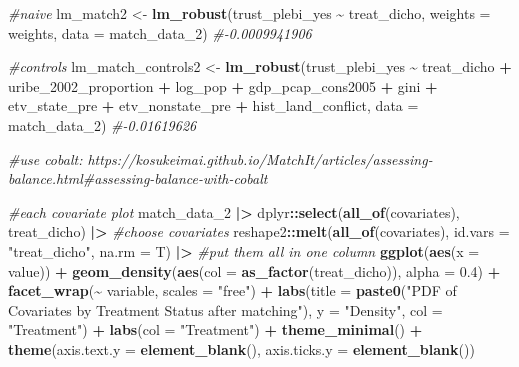 \documentclass[
]{article}
\newenvironment{Shaded}{\begin{snugshade}}{\end{snugshade}}
\newcommand{\AttributeTok}[1]{\textcolor[rgb]{0.13,0.29,0.53}{#1}}
\newcommand{\CommentTok}[1]{\textcolor[rgb]{0.56,0.35,0.01}{\textit{#1}}}
\newcommand{\FloatTok}[1]{\textcolor[rgb]{0.00,0.00,0.81}{#1}}
\newcommand{\FunctionTok}[1]{\textcolor[rgb]{0.13,0.29,0.53}{\textbf{#1}}}
\newcommand{\NormalTok}[1]{#1}
\newcommand{\OtherTok}[1]{\textcolor[rgb]{0.56,0.35,0.01}{#1}}
\newcommand{\SpecialCharTok}[1]{\textcolor[rgb]{0.81,0.36,0.00}{\textbf{#1}}}
\newcommand{\StringTok}[1]{\textcolor[rgb]{0.31,0.60,0.02}{#1}}
\begin{document}
\begin{Shaded}
\begin{Highlighting}[]
\CommentTok{\#naive}
\NormalTok{lm\_match2 }\OtherTok{\textless{}{-}} \FunctionTok{lm\_robust}\NormalTok{(trust\_plebi\_yes }\SpecialCharTok{\textasciitilde{}}\NormalTok{ treat\_dicho, }\AttributeTok{weights =}\NormalTok{ weights, }\AttributeTok{data =}\NormalTok{ match\_data\_2) }\CommentTok{\#{-}0.0009941906}

\CommentTok{\#controls}
\NormalTok{lm\_match\_controls2 }\OtherTok{\textless{}{-}} \FunctionTok{lm\_robust}\NormalTok{(trust\_plebi\_yes }\SpecialCharTok{\textasciitilde{}}\NormalTok{ treat\_dicho }\SpecialCharTok{+}\NormalTok{ uribe\_2002\_proportion }\SpecialCharTok{+}\NormalTok{ log\_pop }\SpecialCharTok{+}\NormalTok{ gdp\_pcap\_cons2005 }\SpecialCharTok{+}\NormalTok{  gini }\SpecialCharTok{+}\NormalTok{ etv\_state\_pre }\SpecialCharTok{+}\NormalTok{ etv\_nonstate\_pre }\SpecialCharTok{+}\NormalTok{ hist\_land\_conflict, }\AttributeTok{data =}\NormalTok{ match\_data\_2) }\CommentTok{\#{-}0.01619626}

\CommentTok{\#use cobalt: https://kosukeimai.github.io/MatchIt/articles/assessing{-}balance.html\#assessing{-}balance{-}with{-}cobalt}

\CommentTok{\#each covariate plot}
\NormalTok{match\_data\_2 }\SpecialCharTok{|\textgreater{}}
\NormalTok{  dplyr}\SpecialCharTok{::}\FunctionTok{select}\NormalTok{(}\FunctionTok{all\_of}\NormalTok{(covariates), treat\_dicho) }\SpecialCharTok{|\textgreater{}} \CommentTok{\#choose covariates}
\NormalTok{  reshape2}\SpecialCharTok{::}\FunctionTok{melt}\NormalTok{(}\FunctionTok{all\_of}\NormalTok{(covariates), }\AttributeTok{id.vars =} \StringTok{"treat\_dicho"}\NormalTok{, }\AttributeTok{na.rm =}\NormalTok{ T) }\SpecialCharTok{|\textgreater{}} \CommentTok{\#put them all in one column}
  \FunctionTok{ggplot}\NormalTok{(}\FunctionTok{aes}\NormalTok{(}\AttributeTok{x =}\NormalTok{ value)) }\SpecialCharTok{+}
  \FunctionTok{geom\_density}\NormalTok{(}\FunctionTok{aes}\NormalTok{(}\AttributeTok{col =} \FunctionTok{as\_factor}\NormalTok{(treat\_dicho)), }\AttributeTok{alpha =} \FloatTok{0.4}\NormalTok{) }\SpecialCharTok{+}
  \FunctionTok{facet\_wrap}\NormalTok{(}\SpecialCharTok{\textasciitilde{}}\NormalTok{ variable, }\AttributeTok{scales =} \StringTok{"free"}\NormalTok{) }\SpecialCharTok{+}
  \FunctionTok{labs}\NormalTok{(}\AttributeTok{title =} \FunctionTok{paste0}\NormalTok{(}\StringTok{"PDF of Covariates by Treatment Status after matching"}\NormalTok{),}
       \AttributeTok{y =} \StringTok{"Density"}\NormalTok{, }\AttributeTok{col =} \StringTok{"Treatment"}\NormalTok{) }\SpecialCharTok{+}
  \FunctionTok{labs}\NormalTok{(}\AttributeTok{col =} \StringTok{"Treatment"}\NormalTok{) }\SpecialCharTok{+}
  \FunctionTok{theme\_minimal}\NormalTok{() }\SpecialCharTok{+}
  \FunctionTok{theme}\NormalTok{(}\AttributeTok{axis.text.y =} \FunctionTok{element\_blank}\NormalTok{(), }\AttributeTok{axis.ticks.y =} \FunctionTok{element\_blank}\NormalTok{())}
\end{Highlighting}
\end{Shaded}
\end{document}
